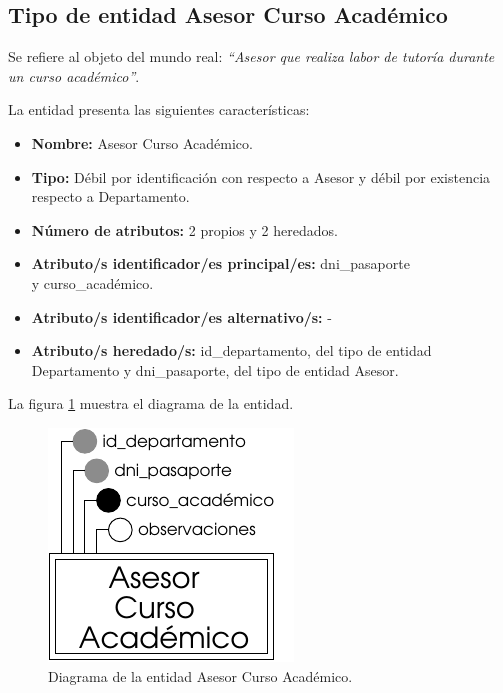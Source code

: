 \subsection{Tipo de entidad Asesor Curso Académico}

   \begin{description}

   \item[Definición] Se refiere al objeto del mundo real: \emph{``Asesor
   que realiza labor de tutoría durante un curso académico''}.

   \item[Características] La entidad presenta las siguientes características:
      \begin{itemize}
         \item \textbf{Nombre:} Asesor Curso Académico.
         \item \textbf{Tipo:} Débil por identificación con respecto a Asesor y débil por existencia respecto a Departamento.
         \item \textbf{Número de atributos:} 2 propios y 2 heredados.
         \item \textbf{Atributo/s identificador/es principal/es:} dni\_pasaporte\\ y curso\_académico.
         \item \textbf{Atributo/s identificador/es alternativo/s:} -
         \item \textbf{Atributo/s heredado/s:} id\_departamento, del tipo de entidad Departamento y dni\_pasaporte, del tipo de entidad Asesor.
      \end{itemize}

   \item[Diagrama] La figura \ref{diagramaAsesorCA} muestra el diagrama de la entidad.
   \item \begin{figure}[!ht]
            \begin{center}
            \includegraphics[]{07.Modelo_Entidad-Interrelacion/7.2.Analisis_Entidades/diagramas/asesorca.pdf}
            \caption{Diagrama de la entidad Asesor Curso Académico.}
            \label{diagramaAsesorCA}
            \end{center}
         \end{figure}


\end{description}
